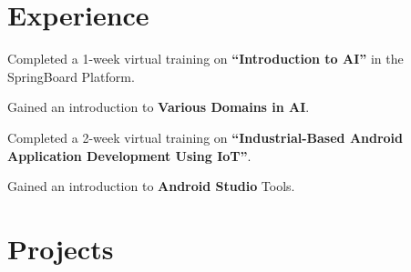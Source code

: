 \documentclass[]{deedy-resume-openfont}
\begin{document}
\begin{minipage}[t]{0.66\textwidth}


    \section{Experience}

    \vspace{\topsep}
    \begin{tightemize}
        \item Completed a 1-week virtual training on \textbf{``Introduction to AI''} in the SpringBoard Platform.
        \item Gained an introduction to \textbf{Various Domains in AI}.
    \end{tightemize}
    \sectionsep

    \begin{tightemize}
        \item Completed a 2-week virtual training on \textbf{``Industrial-Based Android Application Development Using IoT''}.
        \item Gained an introduction to \textbf{Android Studio} Tools.
    \end{tightemize}
    \sectionsep




    \section{Projects}


\end{minipage}
\end{document}
